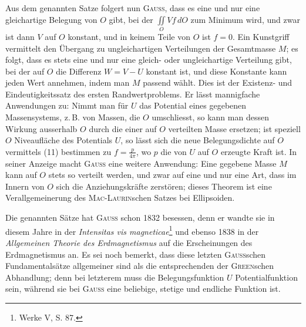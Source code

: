 Aus dem genannten Satze folgert nun \textsc{Gauss}, dass es eine und nur eine
gleichartige Belegung von \(O\) gibt, bei der \(\iint\limits_O Vf\,dO\) zum Minimum wird, und
zwar ist dann \(V\) auf \(O\) konstant, und in keinem Teile von \(O\) ist \(f=0\).
Ein Kunstgriff vermittelt den Übergang zu ungleichartigen Verteilungen der
Gesamtmasse \(M\); es folgt, dass es stets eine und nur eine gleich- oder ungleichartige
Verteilung gibt, bei der auf \(O\) die Differenz \(W=V-U\) konstant
ist, und diese Konstante kann jeden Wert annehmen, indem man \(M\)
passend wählt. Dies ist der Existenz- und Eindeutigkeitssatz des ersten Randwertproblems.
Er lässt mannigfache Anwendungen zu: Nimmt man für \(U\) das
Potential eines gegebenen Massensystems, z.\,B. von Massen, die \(O\) umschliesst, so
\clearpage{}
\noindent kann man dessen Wirkung ausserhalb \(O\) durch die einer auf \(O\) verteilten Masse
ersetzen; ist speziell \(O\) Niveaufläche des Potentials \(U\), so lässt sich die neue Belegungsdichte
auf \(O\) vermittels (11) bestimmen zu \(f=\frac{p}{4\pi}\), wo \(p\) die von \(U\)
auf \(O\) erzeugte Kraft ist. In seiner Anzeige macht \textsc{Gauss} eine weitere Anwendung:
Eine gegebene Masse \(M\) kann auf \(O\) stets so verteilt werden, und
zwar auf eine und nur eine Art, dass im Innern von \(O\) sich die Anziehungskräfte
zerstören; dieses Theorem ist eine Verallgemeinerung des \textsc{Mac-Laurin}schen
Satzes bei Ellipsoiden.

Die genannten Sätze hat \textsc{Gauss} schon 1832 besessen, denn er wandte sie
in diesem Jahre in der \textit{Intensitas vis magneticae}\footnote{Werke V, S. 87.} und ebenso 1838 in der \textit{Allgemeinen
Theorie des Erdmagnetismus} auf die Erscheinungen des Erdmagnetismus
an. Es sei noch bemerkt, dass diese letzten \textsc{Gauss}schen Fundamentalsätze
allgemeiner sind als die entsprechenden der \textsc{Green}schen Abhandlung;
denn bei letzterem muss die Belegungsfunktion \(U\) Potentialfunktion sein,
während sie bei \textsc{Gauss} eine beliebige, stetige und endliche Funktion ist.
\clearpage\endgroup

